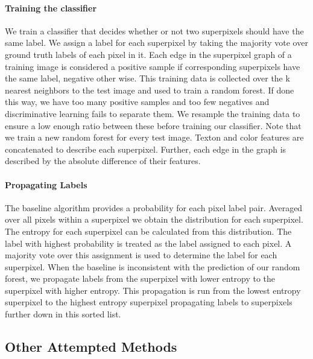 \documentclass{article} %
\begin{document}
\paragraph{Training the classifier}
We train a classifier that decides whether or not two superpixels should
have the same label.
We assign a label for each superpixel by taking the majority vote over
ground truth labels of each pixel in it.
Each edge in the superpixel graph of a training image is considered a
positive sample if corresponding superpixels have the same label,
negative other wise.
This training data is collected over the k nearest neighbors to the test
image and used to train a random forest.
If done this way, we have too many positive samples and too few negatives
and discriminative learning fails to separate them.
We resample the training data to ensure a low enough ratio between these
before training our classifier.
Note that we train a new random forest for every test image.
Texton and color features are concatenated to describe each superpixel.
Further, each edge in the graph is described by the absolute difference of
their features.

\paragraph{Propagating Labels}
The baseline algorithm provides a probability for each pixel label pair. Averaged over all pixels within a superpixel we obtain the distribution for each superpixel.
The entropy for each superpixel can be calculated from this distribution.
The label with highest probability is treated as the label assigned to
each pixel.
A majority vote over this assignment is used to determine the label for
each superpixel.
When the baseline is inconsistent with the prediction of our random
forest, we propagate labels from the superpixel with lower entropy to
the superpixel with higher entropy.
This propagation is run from the lowest entropy superpixel to the highest
entropy superpixel propagating labels to superpixels further down in
this sorted list.

\subsection{Other Attempted Methods}
\end{document}

